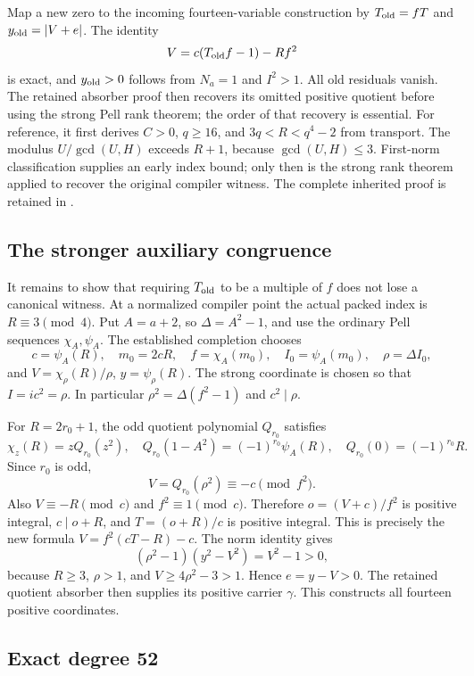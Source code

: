 \documentclass[11pt,a4paper]{article}
\theoremstyle{definition}\newtheorem{definition}[theorem]{Definition}
\theoremstyle{remark}\newtheorem{remark}[theorem]{Remark}
\newcommand{\code}[1]{\texttt{\small\detokenize{#1}}}
\begin{document}
Map a new zero to the incoming fourteen-variable construction by
$T_{\rm old}=fT$ and $y_{\rm old}=|V+e|$. The identity
\[
 V=c(T_{\rm old}f-1)-Rf^2
\]
is exact, and $y_{\rm old}>0$ follows from $N_a=1$ and $I^2>1$.
All old residuals vanish. The retained absorber proof then recovers its
omitted positive quotient before using the strong Pell rank theorem;
the order of that recovery is essential. For reference, it first derives
$C>0$, $q\ge16$, and $3q<R<q^4-2$ from transport. The modulus
$U/\gcd(U,H)$ exceeds $R+1$, because $\gcd(U,H)\le3$. First-norm
classification supplies an early index bound; only then is the strong
rank theorem applied to recover the original compiler witness.
The complete inherited proof is retained in
\code{fourteen/upstream/FOURTEEN_PROOF.md}.

\subsection{The stronger auxiliary congruence}

It remains to show that requiring $T_{\rm old}$ to be a multiple of $f$
does not lose a canonical witness. At a normalized compiler point the
actual packed index is $R\equiv3\pmod4$. Put $A=a+2$, so
$\Delta=A^2-1$, and use the ordinary Pell sequences $\chi_A,\psi_A$.
The established completion chooses
\[
 c=\psi_A(R),\quad m_0=2cR,\quad f=\chi_A(m_0),\quad
 I_0=\psi_A(m_0),\quad \rho=\Delta I_0,
\]
and $V=\chi_\rho(R)/\rho$, $y=\psi_\rho(R)$. The strong coordinate is
chosen so that $I=ic^2=\rho$. In particular
$\rho^2=\Delta(f^2-1)$ and $c^2\mid\rho$.

For $R=2r_0+1$, the odd quotient polynomial $Q_{r_0}$ satisfies
\[
 \chi_z(R)=zQ_{r_0}(z^2),\quad
 Q_{r_0}(1-A^2)=(-1)^{r_0}\psi_A(R),\quad
 Q_{r_0}(0)=(-1)^{r_0}R.
\]
Since $r_0$ is odd,
\begin{equation}\label{eq:squared-congruence}
 V=Q_{r_0}(\rho^2)\equiv-c\pmod{f^2}.
\end{equation}
Also $V\equiv-R\pmod c$ and $f^2\equiv1\pmod c$. Therefore
$o=(V+c)/f^2$ is positive integral, $c\mid o+R$, and
$T=(o+R)/c$ is positive integral. This is precisely the new formula
$V=f^2(cT-R)-c$. The norm identity gives
\[
 (\rho^2-1)(y^2-V^2)=V^2-1>0,
\]
because $R\ge3$, $\rho>1$, and $V\ge4\rho^2-3>1$.
Hence $e=y-V>0$. The retained quotient absorber then supplies its positive
carrier $\gamma$. This constructs all fourteen positive coordinates.

\subsection{Exact degree 52}
\end{document}
